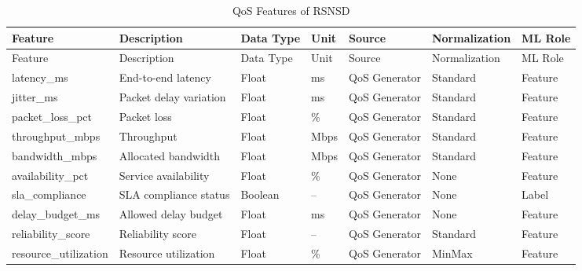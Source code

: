 \documentclass[12pt,a4paper]{article}
\begin{document}
\begin{longtable}{p{3cm}p{5cm}p{2cm}p{1.5cm}p{2.3cm}p{2cm}p{2cm}}
	\caption{QoS Features of RSNSD}
	\label{tab:qos_features}\\
	
	\toprule
	Feature & Description & Data Type & Unit & Source & Normalization & ML Role\\
	\midrule
	\endfirsthead
	
	\toprule
	Feature & Description & Data Type & Unit & Source & Normalization & ML Role\\
	\midrule
	\endhead
	
	latency\_ms & End-to-end latency & Float & ms & QoS Generator & Standard & Feature\\
	jitter\_ms & Packet delay variation & Float & ms & QoS Generator & Standard & Feature\\
	packet\_loss\_pct & Packet loss & Float & \% & QoS Generator & Standard & Feature\\
	throughput\_mbps & Throughput & Float & Mbps & QoS Generator & Standard & Feature\\
	bandwidth\_mbps & Allocated bandwidth & Float & Mbps & QoS Generator & Standard & Feature\\
	availability\_pct & Service availability & Float & \% & QoS Generator & None & Feature\\
	sla\_compliance & SLA compliance status & Boolean & -- & QoS Generator & None & Label\\
	delay\_budget\_ms & Allowed delay budget & Float & ms & QoS Generator & None & Feature\\
	reliability\_score & Reliability score & Float & -- & QoS Generator & Standard & Feature\\
	resource\_utilization & Resource utilization & Float & \% & QoS Generator & MinMax & Feature\\
	
	\bottomrule
\end{longtable}
\end{document}
